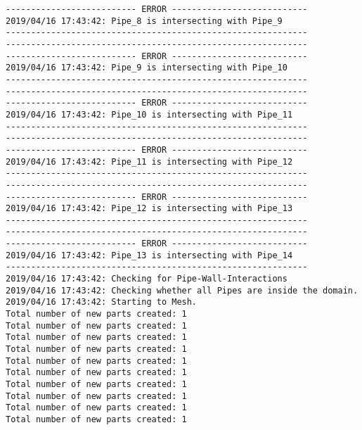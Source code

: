 \documentclass{article}
\begin{document}
{\begin{verbatim}
-------------------------- ERROR ---------------------------
2019/04/16 17:43:42: Pipe_8 is intersecting with Pipe_9
------------------------------------------------------------
------------------------------------------------------------
-------------------------- ERROR ---------------------------
2019/04/16 17:43:42: Pipe_9 is intersecting with Pipe_10
------------------------------------------------------------
------------------------------------------------------------
-------------------------- ERROR ---------------------------
2019/04/16 17:43:42: Pipe_10 is intersecting with Pipe_11
------------------------------------------------------------
------------------------------------------------------------
-------------------------- ERROR ---------------------------
2019/04/16 17:43:42: Pipe_11 is intersecting with Pipe_12
------------------------------------------------------------
------------------------------------------------------------
-------------------------- ERROR ---------------------------
2019/04/16 17:43:42: Pipe_12 is intersecting with Pipe_13
------------------------------------------------------------
------------------------------------------------------------
-------------------------- ERROR ---------------------------
2019/04/16 17:43:42: Pipe_13 is intersecting with Pipe_14
------------------------------------------------------------
2019/04/16 17:43:42: Checking for Pipe-Wall-Interactions
2019/04/16 17:43:42: Checking whether all Pipes are inside the domain.
2019/04/16 17:43:42: Starting to Mesh.
Total number of new parts created: 1
Total number of new parts created: 1
Total number of new parts created: 1
Total number of new parts created: 1
Total number of new parts created: 1
Total number of new parts created: 1
Total number of new parts created: 1
Total number of new parts created: 1
Total number of new parts created: 1
Total number of new parts created: 1
\end{verbatim}
}
\clearpage
\end{document}
